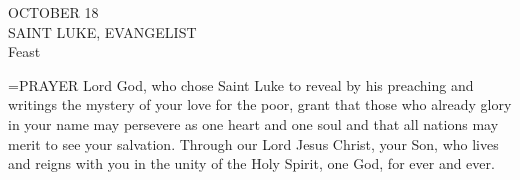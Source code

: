 \begin{center}\normalsize OCTOBER 18\\
\footnotesize SAINT LUKE, EVANGELIST\\
\footnotesize Feast\\
\end{center}

\hangindent=\parindent \small{PRAYER 
Lord God, who chose Saint Luke
to reveal by his preaching and writings
the mystery of your love for the poor,
grant that those who already glory in your name
may persevere as one heart and one soul
and that all nations may merit to see your salvation.
Through our Lord Jesus Christ, your Son,
who lives and reigns with you in the unity of the Holy Spirit,
one God, for ever and ever.\\}
 
